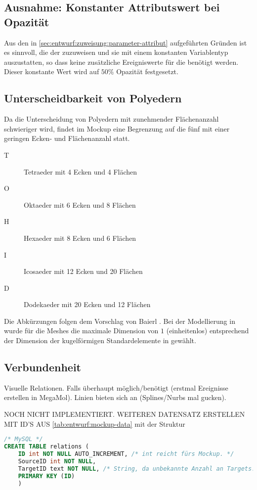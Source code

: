 \subsection{Ausnahme: Konstanter Attributswert bei Opazität}

Aus den in \autoref{sec:entwurf:zuweisung:parameter-attribut} aufgeführten Gründen ist es sinnvoll, die  der  zuzuweisen und sie mit einem konstanten Variablentyp auszustatten, so dass keine zusätzliche Ereigniswerte für die  benötigt werden. Dieser konstante Wert wird auf $50\%$ Opazität festgesetzt.

\subsection{Unterscheidbarkeit von Polyedern}

Da die Unterscheidung von Polyedern mit zunehmender Flächenanzahl schwieriger wird, findet im Mockup eine Begrenzung auf die fünf  mit einer geringen Ecken- und Flächenanzahl statt.
\begin{description}
\item[T] Tetraeder mit 4 Ecken und 4 Flächen
\item[O] Oktaeder mit 6 Ecken und 8 Flächen
\item[H] Hexaeder mit 8 Ecken und 6 Flächen
\item[I] Icosaeder mit 12 Ecken und 20 Flächen
\item[D] Dodekaeder mit 20 Ecken und 12 Flächen
\end{description}
Die Abkürzungen folgen dem Vorschlag von Baierl \cite[S.~42]{KonvexePolyeder}. Bei der Modellierung in  wurde für die Meshes die maximale Dimension von $1$ (einheitenlos) entsprechend der Dimension der kugelförmigen Standardelemente in  gewählt.

\subsection{Verbundenheit}
Visuelle Relationen. Falls überhaupt möglich/benötigt (erstmal Ereignisse erstellen in MegaMol). Linien bieten sich an (Splines/Nurbs mal gucken).

NOCH NICHT IMPLEMENTIERT. WEITEREN DATENSATZ ERSTELLEN MIT ID'S AUS \autoref{tab:entwurf:mockup-data} mit der Struktur

\begin{lstlisting}[language=SQL]
/* MySQL */
CREATE TABLE relations (
	ID int NOT NULL AUTO_INCREMENT, /* int reicht fürs Mockup. */
	SourceID int NOT NULL,
	TargetID text NOT NULL, /* String, da unbekannte Anzahl an Targets. */
	PRIMARY KEY (ID)
	)
\end{lstlisting}

